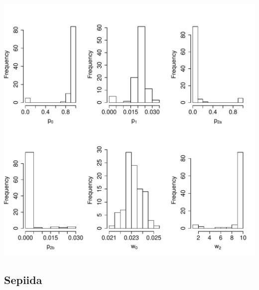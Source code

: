 \documentclass[12pt,letterpaper]{article}\usepackage[]{graphicx}\usepackage[]{color}
\makeatletter
\def\maxwidth{ %
  \ifdim\Gin@nat@width>\linewidth
    \linewidth
  \else
    \Gin@nat@width
  \fi
}
\newenvironment{knitrout}{}{} %
\makeatother
\begin{document}
\begin{knitrout}
\color{fgcolor}

{\centering \includegraphics[width=\maxwidth]{./figures/Oegopsida_plots-1} 

}



\end{knitrout}

\clearpage

\subsection*{Sepiida}
\end{document}
